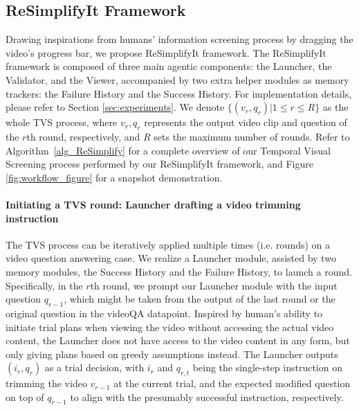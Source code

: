 \subsection{ReSimplifyIt Framework}
Drawing inspirations from humans' information screening process by dragging the video's progress bar, we propose ReSimplifyIt framework. The ReSimplifyIt framework is composed of three main agentic components: the Launcher, the Validator, and the Viewer, accompanied by two extra helper modules as memory trackers: the Failure History and the Success History.   For implementation details, please refer to Section \ref{sec:experiments}. We denote $\{(v_r, q_r)|1 \leq r \leq R\}$ as the whole TVS process, where $v_r, q_r$ represents the output video clip and question of the $r$th round, respectively, and $R$ sets the maximum number of rounds.  Refer to Algorithm~\ref{alg_ReSimplify} for a complete overview of our Temporal Visual Screening process performed by our ReSimplifyIt framework, and Figure \ref{fig:workflow_figure} for a snapshot demonstration. 





\paragraph{Initiating a TVS round: Launcher drafting a video trimming instruction}
The TVS process can be iteratively applied multiple times (i.e. rounds) on a video question answering case. We realize a Launcher module, assisted by two memory modules, the Success History and the Failure History, to launch a round. Specifically, in the $r$th round, we prompt our Launcher module with the input question $q_{r-1}$, which might be taken from the output of the last round or the original question in the videoQA datapoint. Inspired by human's ability to initiate trial plans when viewing the video without accessing the actual video content, the Launcher does not have access to the video content in any form, but only giving plans based on greedy assumptions instead. The Launcher outputs $(i_{r}, q_{r})$ as a trial decision, with $i_{r}$ and $q_{r, t}$ being the single-step instruction on trimming the video $v_{r-1}$ at the current trial, and the expected modified question on top of $q_{r-1}$ to align with the presumably successful instruction, respectively. 

